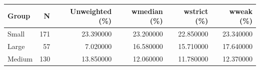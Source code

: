 \begin{tabular}{lrrrrr}
\toprule
Group & N & Unweighted (\%) & wmedian (\%) & wstrict (\%) & wweak (\%) \\
\midrule
Small & 171 & 23.390000 & 23.200000 & 22.850000 & 23.340000 \\
Large & 57 & 7.020000 & 16.580000 & 15.710000 & 17.640000 \\
Medium & 130 & 13.850000 & 12.060000 & 11.780000 & 12.370000 \\
\bottomrule
\end{tabular}
